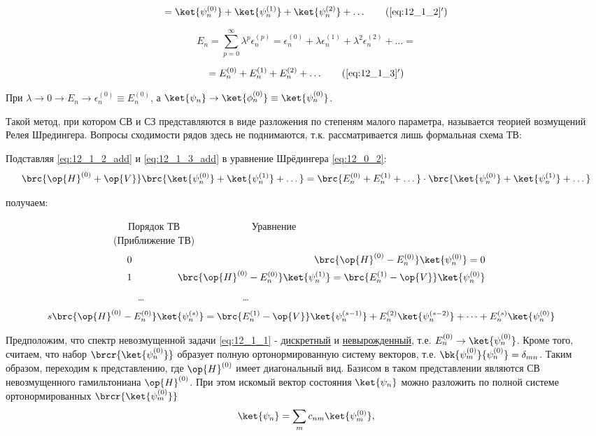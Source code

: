 \begin{equation}
\label{eq:12_1_2_add}
= \ket{\psi_n^{(0)}} + \ket{\psi_n^{(1)}} + \ket{\psi_n^{(2)}} + \dots
\tag{\ref{eq:12_1_2}$'$}
\end{equation}

\begin{equation}
\label{eq:12_1_3}
E_n = \sum_{p=0}^{\infty} \lambda^p \epsilon_n^{(p)} = \epsilon_n^{(0)} + \lambda \epsilon_n^{(1)} + \lambda^2 \epsilon_n^{(2)} + \dots = 
\end{equation}

\begin{equation}
\label{eq:12_1_3_add}
= E_n^{(0)} + E_n^{(1)} + E_n^{(2)} + \dots
\tag{\ref{eq:12_1_3}$'$}
\end{equation}

При $\lambda \to 0 \rightarrow E_n \to \epsilon_n^{(0)} \equiv E_n^{(0)}$, а $\ket{\psi_n} \to \ket{\phi_n^{(0)}} \equiv \ket{\psi_n^{(0)}}$.

Такой метод, при котором СВ и СЗ представляются в виде разложения по степеням малого параметра, называется теорией возмущений Релея Шредингера. Вопросы сходимости рядов здесь не поднимаются, т.к. рассматривается лишь формальная схема ТВ:

Подставляя \eqref{eq:12_1_2_add} и \eqref{eq:12_1_3_add} в уравнение Шрёдингера \eqref{eq:12_0_2}:
$$
\brc{\op{H}^{(0)} + \op{V}} \brc{\ket{\psi_n^{(0)}} + \ket{\psi_n^{(1)}} + \dots} = \brc{E_n^{(0)} + E_n^{(1)} + \dots} \cdot \brc{\ket{\psi_n^{(0)}} + \ket{\psi_n^{(1)}} + \dots}
$$

получаем:

~~~~~~~~~~~~~~~~~~~~~~~~~Порядок ТВ ~~~~~~~~~~~~~~Уравнение\\
~~~~~~~~~~~~~~~~~~~~~~(Приближение ТВ) ~~~~~~~~~~~~~~
\begin{eqnarray}
\label{eq:12_1_4} 0 &~~~~~~~~~~~& \brc{\op{H}^{(0)} - E_n^{(0)}} \ket{\psi_n^{(0)}} = 0\\
\label{eq:12_1_5} 1 &~~~~~~~~~~~& \brc{\op{H}^{(0)} - E_n^{(0)}} \ket{\psi_n^{(1)}} = \brc{E_n^{(1)} - \op{V}} \ket{\psi_n^{(0)}} 
\end{eqnarray}
~~~~~~~~~~~~~~~~~~~~~~~~~~~\dots~~~~~~~~~~~~~~~~~~~~\dots
\begin{eqnarray}
 \label{eq:12_1_6} s & \brc{\op{H}^{(0)} - E_n^{(0)}} \ket{\psi_n^{(s)}} = \brc{E_n^{(1)} - \op{V}} \ket{\psi_n^{(s-1)}}  + E_n^{(2)}\ket{\psi_n^{(s-2)}}+\dots+ E_n^{(s)}\ket{\psi_n^{(0)}}
\end{eqnarray}

Предположим, что спектр невозмущенной задачи \eqref{eq:12_1_1} - \underline{дискретный} и \underline{невырожденный}, т.е. $E_n^{(0)} \to \ket{\psi_n^{(0)}}$. Кроме того, считаем, что набор $\brcr{\ket{\psi_n^{(0)}}}$ образует полную ортонормированную систему векторов, т.е. $\bk{\psi_m^{(0)}}{\psi_n^{(0)}} = \delta_{mn}$. Таким образом, переходим к представлению, где $\op{H}^{(0)}$ имеет диагональный вид. Базисом в таком представлении являются СВ невозмущенного гамильтониана $\op{H}^{(0)}$. При этом искомый вектор состояния $\ket{\psi_n}$ можно разложить по полной системе ортонормированных $\brcr{\ket{\psi_m^{(0)}}}$
$$
\ket{\psi_n}= \sum_m c_{nm} \ket{\psi_m^{(0)}}, 
$$

